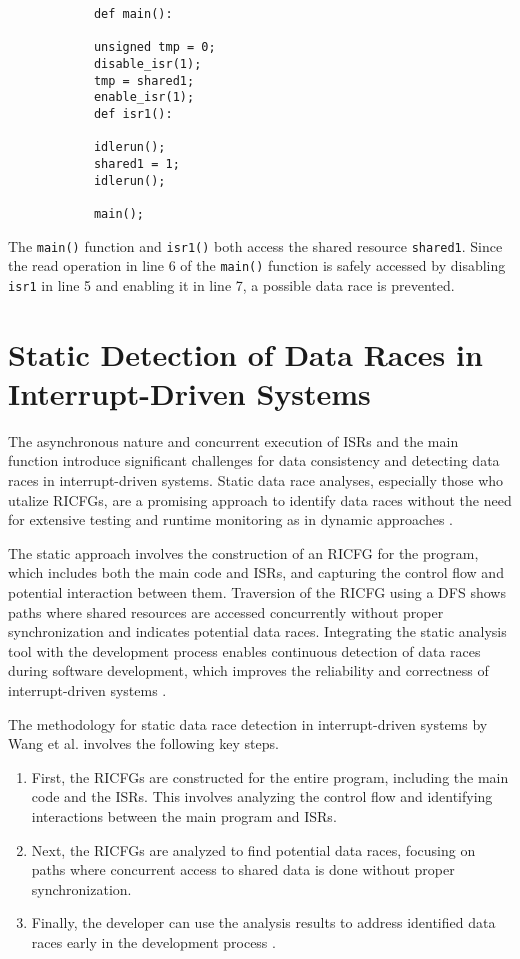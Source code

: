 \documentclass[
fancyheadings, %
%
%
]{stsreprt}
\begin{document}
{\begin{lstlisting}
			def main():
			
			unsigned tmp = 0;
			disable_isr(1);
			tmp = shared1;
			enable_isr(1);
			def isr1():
			
			idlerun();
			shared1 = 1;
			idlerun();
			
			main();
		\end{lstlisting}
			
		
		 The \texttt{main()} function and \texttt{isr1()} both access the shared resource \texttt{shared1}. Since the read operation in line 6 of the \texttt{main()} function is safely accessed by disabling \texttt{isr1} in line 5 and enabling it in line 7, a possible data race is prevented.
		
		\section{Static Detection of Data Races in Interrupt-Driven Systems}
		
		The asynchronous nature and concurrent execution of \acp{ISR} and the main function introduce significant challenges for data consistency and detecting data races in interrupt-driven systems. Static data race analyses, especially those who utalize \acp{RICFG}, are a promising approach to identify data races without the need for extensive testing and runtime monitoring as in dynamic approaches \cite{wang2020}.
		
		The static approach involves the construction of an \ac{RICFG} for the program, which includes both the main code and \acp{ISR}, and capturing the control flow and potential interaction between them. Traversion of the \ac{RICFG} using a \Ac{DFS} shows paths where shared resources are accessed concurrently without proper synchronization and indicates potential data races. Integrating the static analysis tool with the development process enables continuous detection of data races during software development, which improves the reliability and correctness of interrupt-driven systems \cite{wang2020}.
		
		The methodology for static data race detection in interrupt-driven systems by Wang et al. involves the following key steps.
		\begin{enumerate}
			\item First, the \acp{RICFG} are constructed for the entire program, including the main code and the \acp{ISR}. This involves analyzing the control flow and identifying interactions between the main program and \acp{ISR}. 
			\item Next, the \acp{RICFG} are analyzed to find potential data races, focusing on paths where concurrent access to shared data is done without proper synchronization. 
			\item Finally, the developer can use the analysis results to address identified data races early in the development process \cite{wang2020}.
		\end{enumerate}
		
}
\end{document}
